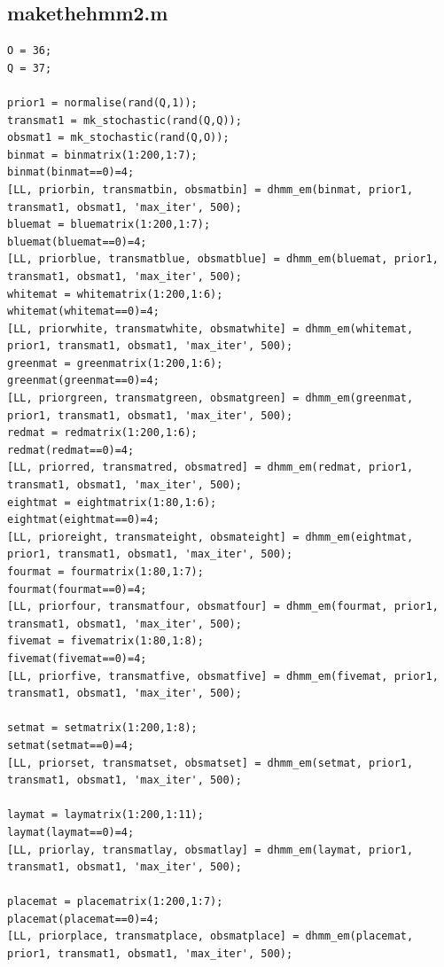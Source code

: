 \documentclass[a4paper,11pt]{article}
\begin{document}
\subsection{makethehmm2.m}
\label{makethehmm2.m}
\begin{lstlisting}[style=myMatlabstyle]
O = 36;
Q = 37;

prior1 = normalise(rand(Q,1));
transmat1 = mk_stochastic(rand(Q,Q));
obsmat1 = mk_stochastic(rand(Q,O));
binmat = binmatrix(1:200,1:7);
binmat(binmat==0)=4;
[LL, priorbin, transmatbin, obsmatbin] = dhmm_em(binmat, prior1, transmat1, obsmat1, 'max_iter', 500);
bluemat = bluematrix(1:200,1:7);
bluemat(bluemat==0)=4;
[LL, priorblue, transmatblue, obsmatblue] = dhmm_em(bluemat, prior1, transmat1, obsmat1, 'max_iter', 500);
whitemat = whitematrix(1:200,1:6);
whitemat(whitemat==0)=4;
[LL, priorwhite, transmatwhite, obsmatwhite] = dhmm_em(whitemat, prior1, transmat1, obsmat1, 'max_iter', 500);
greenmat = greenmatrix(1:200,1:6);
greenmat(greenmat==0)=4;
[LL, priorgreen, transmatgreen, obsmatgreen] = dhmm_em(greenmat, prior1, transmat1, obsmat1, 'max_iter', 500);
redmat = redmatrix(1:200,1:6);
redmat(redmat==0)=4;
[LL, priorred, transmatred, obsmatred] = dhmm_em(redmat, prior1, transmat1, obsmat1, 'max_iter', 500);
eightmat = eightmatrix(1:80,1:6);
eightmat(eightmat==0)=4;
[LL, prioreight, transmateight, obsmateight] = dhmm_em(eightmat, prior1, transmat1, obsmat1, 'max_iter', 500);
fourmat = fourmatrix(1:80,1:7);
fourmat(fourmat==0)=4;
[LL, priorfour, transmatfour, obsmatfour] = dhmm_em(fourmat, prior1, transmat1, obsmat1, 'max_iter', 500);
fivemat = fivematrix(1:80,1:8);
fivemat(fivemat==0)=4;
[LL, priorfive, transmatfive, obsmatfive] = dhmm_em(fivemat, prior1, transmat1, obsmat1, 'max_iter', 500);

setmat = setmatrix(1:200,1:8);
setmat(setmat==0)=4;
[LL, priorset, transmatset, obsmatset] = dhmm_em(setmat, prior1, transmat1, obsmat1, 'max_iter', 500);

laymat = laymatrix(1:200,1:11);
laymat(laymat==0)=4;
[LL, priorlay, transmatlay, obsmatlay] = dhmm_em(laymat, prior1, transmat1, obsmat1, 'max_iter', 500);

placemat = placematrix(1:200,1:7);
placemat(placemat==0)=4;
[LL, priorplace, transmatplace, obsmatplace] = dhmm_em(placemat, prior1, transmat1, obsmat1, 'max_iter', 500);
\end{lstlisting}
\end{document}
